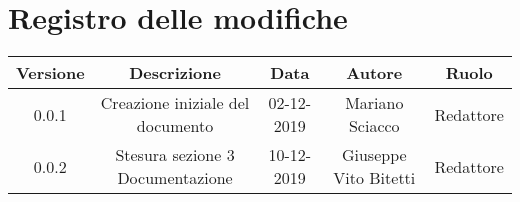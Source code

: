 \section*{Registro delle modifiche}

\begin{center}
	\begin{longtable}{|c|c|c|c|c|}
	\hline
	\rowcolor{lighter-grayer}
	\textbf{Versione} & \textbf{Descrizione} & \textbf{Data} & \textbf{Autore} & \textbf{Ruolo} \\
	\hline
	\endfirsthead


	\hline
	0.0.1 & Creazione iniziale del documento & 02-12-2019 & Mariano Sciacco & Redattore \\
	\hline
	\hline
	0.0.2 & Stesura sezione 3 Documentazione & 10-12-2019 & Giuseppe Vito Bitetti & Redattore \\
	\hline

	\end{longtable}
\end{center}
